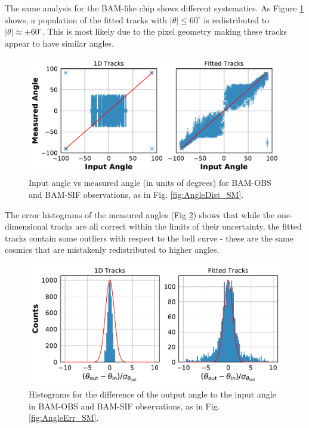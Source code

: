 \documentclass[a4paper, 11pt]{article}
\begin{document}
The same analysis for the BAM-like chip shows different systematics. As Figure \ref{fig:AngleDist_BAM} shows, a population of the fitted tracks with $|\theta| \leq 60^{\circ}$ is redistributed to $|\theta| \approx \pm 60^{\circ}$. This is most likely due to the pixel geometry making these tracks appear to have similar angles.

\begin{figure}[!h]
  \centering
  \includegraphics[width=\textwidth]{images/postprocessing/AngleDist_BAM}
  \caption{Input angle vs measured angle (in units of degrees) for BAM-OBS and BAM-SIF observations, as in Fig. \ref{fig:AngleDist_SM}.} 
  \label{fig:AngleDist_BAM}
\end{figure}

The error histograms of the measured angles (Fig \ref{fig:AngleErr_BAM}) shows that while the one-dimensional tracks are all correct within the limits of their uncertainty, the fitted tracks contain some outliers with respect to the bell curve - these are the same cosmics that are mistakenly redistributed to higher angles.

\begin{figure}[!h]
  \centering
  \includegraphics[width=\textwidth]{images/postprocessing/AngleErr_BAM}
  \caption{Histograms for the difference of the output angle to the input angle in BAM-OBS and BAM-SIF observations, as in Fig. \ref{fig:AngleErr_SM}.}
  \label{fig:AngleErr_BAM}
\end{figure}
\end{document}
